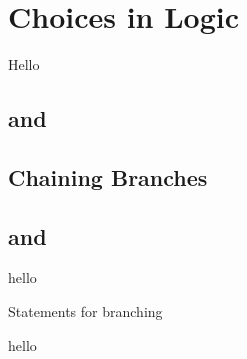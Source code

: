 \section{Choices in Logic}
\label{sec:flow:branch}

Hello

\subsection{ and }
\subsection{}
\subsection{Chaining Branches}
\subsection{ and }

\csharpsubsection{\csharp}
hello

\begin{syntaxfloat}
  
  \caption{Statements for branching}
  \label{syntax:flow:branch}
\end{syntaxfloat}

hello
